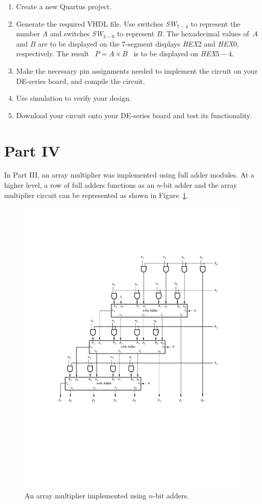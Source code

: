 \documentclass[epsfig,10pt,fullpage]{article}
\begin{document}
\begin{enumerate}
\item Create a new Quartus project.
\item Generate the required VHDL file. Use switches {\it SW}$_{7-4}$ to represent the 
number $A$ and switches {\it SW}$_{3-0}$ to represent $B$. The hexadecimal values of~$A$ 
and $B$ are to be displayed on the 7-segment displays {\it HEX}2 and {\it HEX}0, respectively.
The result ~$P = A \times B$~ is to be displayed on {\it HEX}$5-4$.
\item Make the necessary pin assignments needed to implement the circuit on your
DE-series board, and compile the circuit.
\item Use simulation to verify your design.
\item Download your circuit onto your DE-series board and test its functionality.
\end{enumerate}

\section*{Part IV}
In Part III, an array multiplier was implemented using full adder modules. At a higher level, a row of full adders functions as an $n$-bit adder and the array multiplier circuit can be represented as shown in Figure~\ref{fig:array_mult_adders}.

\begin{figure}[H]
\centerline{
\includegraphics{figures/array_mult_adders}}
\caption{An array multiplier implemented using $n$-bit adders.}
\label{fig:array_mult_adders}
\end{figure}
\end{document}
